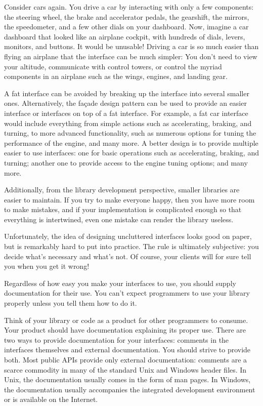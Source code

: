 Consider cars again. You drive a car by interacting with only a few components: the steering wheel, the brake and accelerator pedals, the gearshift, the mirrors, the speedometer, and a few other dials on your dashboard. Now, imagine a car dashboard that looked like an airplane cockpit, with hundreds of dials, levers, monitors, and buttons. It would be unusable! Driving a car is so much easier than flying an airplane that the interface can be much simpler: You don’t need to view your altitude, communicate with control towers, or control the myriad components in an airplane such as the wings, engines, and landing gear.

A fat interface can be avoided by breaking up the interface into several smaller ones. Alternatively, the façade design pattern can be used to provide an easier interface or interfaces on top of a fat interface. For example, a fat car interface would include everything from simple actions such as accelerating, braking, and turning, to more advanced functionality, such as numerous options for tuning the performance of the engine, and many more. A better design is to provide multiple easier to use interfaces: one for basic operations such as accelerating, braking, and turning; another one to provide access to the engine tuning options; and many more.

Additionally, from the library development perspective, smaller libraries are easier to maintain. If you try to make everyone happy, then you have more room to make mistakes, and if your implementation is complicated enough so that everything is intertwined, even one mistake can render the library useless.

Unfortunately, the idea of designing uncluttered interfaces looks good on paper, but is remarkably hard to put into practice. The rule is ultimately subjective: you decide what’s necessary and what’s not. Of course, your clients will for sure tell you when you get it wrong!


Regardless of how easy you make your interfaces to use, you should supply documentation for their use. You can’t expect programmers to use your library properly unless you tell them how to do it.

Think of your library or code as a product for other programmers to consume. Your product should have documentation explaining its proper use.
There are two ways to provide documentation for your interfaces: comments in the interfaces themselves and external documentation. You should strive to provide both. Most public APIs provide only external documentation: comments are a scarce commodity in many of the standard Unix and Windows header files. In Unix, the documentation usually comes in the form of man pages. In Windows, the documentation usually accompanies the integrated development environment or is available on the Internet.

